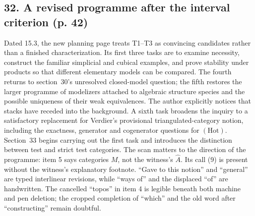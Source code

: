 \subsection*{32. A revised programme after the interval criterion (p. 42)}
Dated 15.3, the new planning page treats T1--T3 as convincing candidates rather than a finished characterization. Its first three tasks are to examine necessity, construct the familiar simplicial and cubical examples, and prove stability under products so that different elementary models can be compared. The fourth returns to section~30's unresolved closed-model question; the fifth restores the larger programme of modelizers attached to algebraic structure species and the possible uniqueness of their weak equivalences. The author explicitly notices that stacks have receded into the background. A sixth task broadens the inquiry to a satisfactory replacement for Verdier's provisional triangulated-category notion, including the exactness, generator and cogenerator questions for $(\mathrm{Hot})$. Section~33 begins carrying out the first task and introduces the distinction between test and strict test categories. The scan matters to the direction of the programme: item 5 says categories $M$, not the witness's $\widehat A$. Its call (9) is present without the witness's explanatory footnote. ``Gave to this notion'' and ``general'' are typed interlinear revisions, while ``ways of'' and the displaced ``of'' are handwritten. The cancelled ``topos'' in item 4 is legible beneath both machine and pen deletion; the cropped completion of ``which'' and the old word after ``constructing'' remain doubtful.

